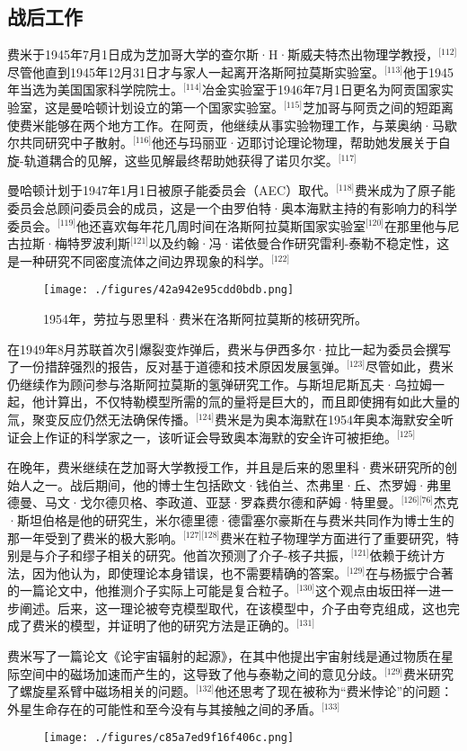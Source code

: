 \subsection{战后工作}
费米于1945年7月1日成为芝加哥大学的查尔斯·H·斯威夫特杰出物理学教授，\(^\text{[112]}\)尽管他直到1945年12月31日才与家人一起离开洛斯阿拉莫斯实验室。\(^\text{[113]}\)他于1945年当选为美国国家科学院院士。\(^\text{[114]}\)冶金实验室于1946年7月1日更名为阿贡国家实验室，这是曼哈顿计划设立的第一个国家实验室。\(^\text{[115]}\)芝加哥与阿贡之间的短距离使费米能够在两个地方工作。在阿贡，他继续从事实验物理工作，与莱奥纳·马歇尔共同研究中子散射。\(^\text{[116]}\)他还与玛丽亚·迈耶讨论理论物理，帮助她发展关于自旋-轨道耦合的见解，这些见解最终帮助她获得了诺贝尔奖。\(^\text{[117]}\)

曼哈顿计划于1947年1月1日被原子能委员会（AEC）取代。\(^\text{[118]}\)费米成为了原子能委员会总顾问委员会的成员，这是一个由罗伯特·奥本海默主持的有影响力的科学委员会。\(^\text{[119]}\)他还喜欢每年花几周时间在洛斯阿拉莫斯国家实验室\(^\text{[120]}\)在那里他与尼古拉斯·梅特罗波利斯\(^\text{[121]}\)以及约翰·冯·诺依曼合作研究雷利-泰勒不稳定性，这是一种研究不同密度流体之间边界现象的科学。\(^\text{[122]}\)
\begin{figure}[ht]
\centering
\texttt{[image: ./figures/42a942e95cdd0bdb.png]}
\caption{1954年，劳拉与恩里科·费米在洛斯阿拉莫斯的核研究所。} \label{fig_ELK_12}
\end{figure}
在1949年8月苏联首次引爆裂变炸弹后，费米与伊西多尔·拉比一起为委员会撰写了一份措辞强烈的报告，反对基于道德和技术原因发展氢弹。\(^\text{[123]}\)尽管如此，费米仍继续作为顾问参与洛斯阿拉莫斯的氢弹研究工作。与斯坦尼斯瓦夫·乌拉姆一起，他计算出，不仅特勒模型所需的氚的量将是巨大的，而且即使拥有如此大量的氚，聚变反应仍然无法确保传播。\(^\text{[124]}\)费米是为奥本海默在1954年奥本海默安全听证会上作证的科学家之一，该听证会导致奥本海默的安全许可被拒绝。\(^\text{[125]}\)

在晚年，费米继续在芝加哥大学教授工作，并且是后来的恩里科·费米研究所的创始人之一。战后期间，他的博士生包括欧文·钱伯兰、杰弗里·丘、杰罗姆·弗里德曼、马文·戈尔德贝格、李政道、亚瑟·罗森费尔德和萨姆·特里曼。\(^\text{[126][76]}\)杰克·斯坦伯格是他的研究生，米尔德里德·德雷塞尔豪斯在与费米共同作为博士生的那一年受到了费米的极大影响。\(^\text{[127][128]}\)费米在粒子物理学方面进行了重要研究，特别是与介子和缪子相关的研究。他首次预测了介子-核子共振，\(^\text{[121]}\)依赖于统计方法，因为他认为，即使理论本身错误，也不需要精确的答案。\(^\text{[129]}\)在与杨振宁合著的一篇论文中，他推测介子实际上可能是复合粒子。\(^\text{[130]}\)这个观点由坂田祥一进一步阐述。后来，这一理论被夸克模型取代，在该模型中，介子由夸克组成，这也完成了费米的模型，并证明了他的研究方法是正确的。\(^\text{[131]}\)

费米写了一篇论文《论宇宙辐射的起源》，在其中他提出宇宙射线是通过物质在星际空间中的磁场加速而产生的，这导致了他与泰勒之间的意见分歧。\(^\text{[129]}\)费米研究了螺旋星系臂中磁场相关的问题。\(^\text{[132]}\)他还思考了现在被称为“费米悖论”的问题：外星生命存在的可能性和至今没有与其接触之间的矛盾。\(^\text{[133]}\)
\begin{figure}[ht]
\centering
\texttt{[image: ./figures/c85a7ed9f16f406c.png]}
\caption{} \label{fig_ELK_13}
\end{figure}